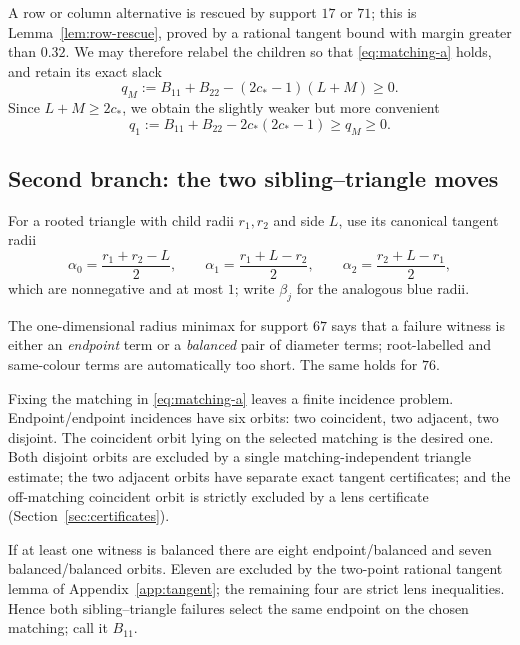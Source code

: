 \documentclass[11pt]{article}
\theoremstyle{plain}
\theoremstyle{definition}
\theoremstyle{remark}
\newcommand{\cstar}{c_{\!*}}
\begin{document}
A row or column alternative is rescued by support $17$ or $71$; this is
Lemma~\ref{lem:row-rescue}, proved by a rational tangent bound with margin
greater than $0.32$.  We may therefore relabel the children so that
\eqref{eq:matching-a} holds, and retain its exact slack
\begin{equation}\label{eq:qM}
 q_M:=B_{11}+B_{22}-(2\cstar-1)(L+M)\ge0 .
\end{equation}
Since $L+M\ge2\cstar$, we obtain the slightly weaker but more convenient
\begin{equation}\label{eq:q1}
 q_1:=B_{11}+B_{22}-2\cstar(2\cstar-1)\ge q_M\ge0 .
\end{equation}

\subsection{Second branch: the two sibling--triangle moves}

For a rooted triangle with child radii $r_1,r_2$ and side $L$, use its
canonical tangent radii
\begin{equation}\label{eq:canonical}
 \alpha_0=\frac{r_1+r_2-L}{2},\qquad
 \alpha_1=\frac{r_1+L-r_2}{2},\qquad
 \alpha_2=\frac{r_2+L-r_1}{2},
\end{equation}
which are nonnegative and at most $1$; write $\beta_j$ for the analogous
blue radii.

The one-dimensional radius minimax for support $67$ says that a failure
witness is either an \emph{endpoint} term or a \emph{balanced} pair of
diameter terms; root-labelled and same-colour terms are automatically too
short.  The same holds for $76$.

Fixing the matching in \eqref{eq:matching-a} leaves a finite incidence
problem.  Endpoint/endpoint incidences have six orbits: two coincident, two
adjacent, two disjoint.  The coincident orbit lying on the selected
matching is the desired one.  Both disjoint orbits are excluded by a single
matching-independent triangle estimate; the two adjacent orbits have
separate exact tangent certificates; and the off-matching coincident orbit
is strictly excluded by a lens certificate
(Section~\ref{sec:certificates}).

If at least one witness is balanced there are eight endpoint/balanced and
seven balanced/balanced orbits.  Eleven are excluded by the two-point
rational tangent lemma of Appendix~\ref{app:tangent}; the remaining four
are strict lens inequalities.  Hence both sibling--triangle failures select
the same endpoint on the chosen matching; call it $B_{11}$.
\end{document}
